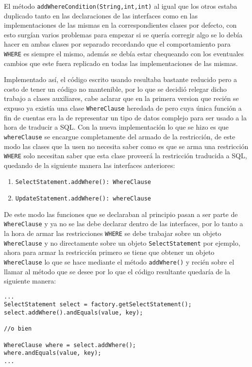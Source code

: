 El método \verb=addWhereCondition(String,int,int)= al igual que los otros estaba duplicado tanto en las declaraciones de las interfaces como en las implementaciones de las mismas en la correspondientes clases por defecto, con esto surgían varios problemas para empezar si se quería corregir algo se lo debía hacer en ambas clases por separado recordando que el comportamiento para \verb=WHERE= es siempre el mismo, además se debía estar chequeando con los eventuales cambios que este fuera replicado en todas las implementaciones de las mismas.

Implementado así, el código escrito usando \jj resultaba bastante reducido pero a costo de tener un código no mantenible, por lo que se decidió relegar dicho trabajo a clases auxiliares, cabe aclarar que en la primera version que recién se expuso ya existía una clase \verb=WhereClause= heredada de \cc pero cuya única función a fin de cuentas era la de representar un tipo de datos complejo para ser usado a la hora de traducir a SQL. Con la nueva implementación lo que se hizo es que \verb=whereClause= se encargue completamente del armado de la restricción, de este modo las clases que la usen no necesita saber como es que se arma una restricción \verb=WHERE= solo necesitan saber que esta clase proveerá la restricción traducida a SQL, quedando de la siguiente manera las interfaces anteriores:
%
\begin{enumerate}
\item \verb=SelectStatement.addWhere(): WhereClause=
\item \verb=UpdateStatement.addWhere(): whereClause=
\end{enumerate}
%
De este modo las funciones que se declaraban al principio pasan a ser parte de  \verb=WhereClause= y ya no se las debe declarar dentro de las interfaces, por lo tanto a la hora de armar las restricciones \verb=WHERE= se debe trabajar sobre un objeto \verb=WhereClause= y no directamente sobre un objeto \verb=SelectStatement= por ejemplo, ahora para armar la restricción primero se tiene que obtener un objeto \verb=WhereClause= lo que se hace mediante el método \verb=addWhere()= y recién sobre el llamar al método que se desee por lo que el código resultante quedaría de la siguiente manera:
%
\begin{lstlisting}[title=Nueva implementación para el uso de las clases auxiliares]
...
SelectStatement select = factory.getSelectStatement();
select.addWhere().andEquals(value, key);

//o bien

WhereClause where = select.addWhere();
where.andEquals(value, key);
...
\end{lstlisting}

